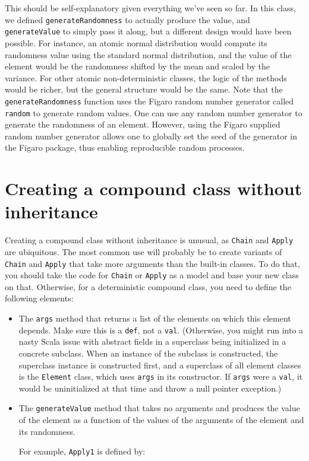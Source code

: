 This should be self-explanatory given everything we've seen so far. In this class, we defined \texttt{generateRandomness} to actually produce the value, and \texttt{generateValue} to simply pass it along, but a different design would have been possible. For instance, an atomic normal distribution would compute its randomness value using the standard normal distribution, and the value of the element would be the randomness shifted by the mean and scaled by the variance. For other atomic non-deterministic classes, the logic of the methods would be richer, but the general structure would be the same. Note that the \texttt{generateRandomness} function uses the Figaro random number generator called \texttt{random} to generate random values. One can use any random number generator to generate the randomness of an element. However, using the Figaro supplied random number generator allows one to globally set the seed of the generator in the Figaro package, thus enabling reproducible random processes.

\section{Creating a compound class without inheritance}

Creating a compound class without inheritance is unusual, as \texttt{Chain} and \texttt{Apply} are ubiquitous. The most common use will probably be to create variants of \texttt{Chain} and \texttt{Apply} that take more arguments than the built-in classes. To do that, you should take the code for \texttt{Chain} or \texttt{Apply} as a model and base your new class on that. Otherwise, for a deterministic compound class, you need to define the following elements:

\begin{itemize}
\item The \texttt{args} method that returns a list of the elements on which this element depends. Make sure this is a \texttt{def}, not a \texttt{val}. (Otherwise, you might run into a nasty Scala issue with abstract fields in a superclass being initialized in a concrete subclass. When an instance of the subclass is constructed, the superclass instance is constructed first, and a superclass of all element classes is the \texttt{Element} class, which uses \texttt{args} in its constructor. If \texttt{args} were a \texttt{val}, it would be uninitialized at that time and throw a null pointer exception.)
\item The  \texttt{generateValue} method that takes no arguments and produces the value of the element as a function of the values of the arguments of the element and its randomness.

For example, \texttt{Apply1} is defined by:

\end{itemize}


